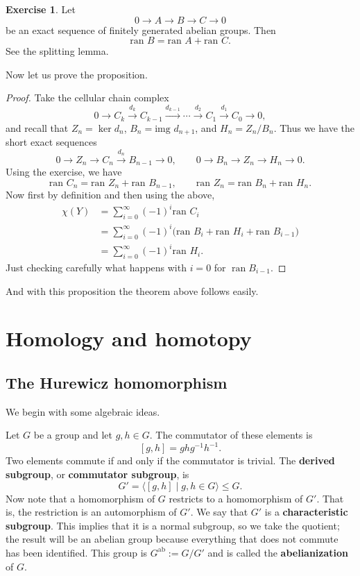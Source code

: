 \documentclass{book}
\theoremstyle{definition}
\newtheorem*{ejer}{Exercise}
\DeclareMathOperator{\ran}{ran}
\begin{document}
\begin{ejer}
Let
$$
0\to A\to B\to C\to0
$$
be an exact sequence of finitely generated abelian groups.
Then
$$
\text{ran }B=\text{ran }A+\text{ran }C.
$$
See the splitting lemma.
\end{ejer}

Now let us prove the proposition.

\begin{proof}
Take the cellular chain complex
$$
0\to C_k\xrightarrow{d_k}C_{k-1}\xrightarrow{d_{k-1}}
\cdots\xrightarrow{d_2}C_1\xrightarrow{d_1}C_0\to0,
$$
and recall that $Z_n=\ker d_n$, $B_n=\text{img }d_{n+1}$,
and $H_n=Z_n/B_n$. Thus we have the short exact sequences
$$
0\to Z_n\to C_n\xrightarrow{d_n}B_{n-1}\to0,
\qquad
0\to B_n\to Z_n\to H_n\to0.
$$
Using the exercise, we have
$$
\text{ran }C_n=\text{ran }Z_n+\text{ran }B_{n-1},
\qquad
\text{ran }Z_n=\text{ran }B_n+\text{ran }H_n.
$$
Now first by definition and then using the above,
$$
\begin{aligned}
\chi(Y)
&=\sum_{i=0}^{\infty}(-1)^i\text{ran }C_i\\
&=\sum_{i=0}^{\infty}(-1)^i
\big(\text{ran }B_i+\text{ran }H_i
+\text{ran }B_{i-1}\big)\\
&=\sum_{i=0}^{\infty}(-1)^i\text{ran }H_i.
\end{aligned}
$$
Just checking carefully what happens with $i=0$ for
$\ran B_{i-1}$.
\end{proof}

And with this proposition the theorem above follows easily.

\chapter{Homology and homotopy}

\section{The Hurewicz homomorphism}

We begin with some algebraic ideas.

Let $G$ be a group and let $g,h\in G$. The commutator of
these elements is
$$
[g,h]=ghg^{-1}h^{-1}.
$$
Two elements commute if and only if the commutator is trivial.
The \textbf{derived subgroup}, or \textbf{commutator
subgroup}, is
$$
G'=\langle[g,h]\mid g,h\in G\rangle\leq G.
$$
Now note that a homomorphism of $G$ restricts to a
homomorphism of $G'$. That is, the restriction is an
automorphism of $G'$. We say that $G'$ is a
\textbf{characteristic subgroup}. This implies that it is a
normal subgroup, so we take the quotient; the result will be
an abelian group because everything that does not commute has
been identified. This group is
$G^{\text{ab}}:=G/G'$ and is called the \textbf{abelianization}
of $G$.
\end{document}
